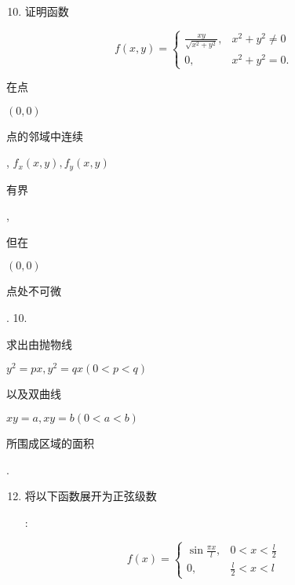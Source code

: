 \documentclass[10pt]{article}
\begin{document}
\begin{enumerate}
  \setcounter{enumi}{9}
  \item \begin{CJK}{UTF8}{mj}证明函数\end{CJK}
\end{enumerate}
$$
f(x, y)= \begin{cases}\frac{x y}{\sqrt{x^{2}+y^{2}}}, & x^{2}+y^{2} \neq 0 \\ 0, & x^{2}+y^{2}=0 .\end{cases}
$$
\begin{CJK}{UTF8}{mj}在点\end{CJK} $(0,0)$ \begin{CJK}{UTF8}{mj}点的邻域中连续\end{CJK}, $f_{x}(x, y), f_{y}(x, y)$ \begin{CJK}{UTF8}{mj}有界\end{CJK}, \begin{CJK}{UTF8}{mj}但在\end{CJK} $(0,0)$ \begin{CJK}{UTF8}{mj}点处不可微\end{CJK}. 10. \begin{CJK}{UTF8}{mj}求出由抛物线\end{CJK} $y^{2}=p x, y^{2}=q x(0<p<q)$ \begin{CJK}{UTF8}{mj}以及双曲线\end{CJK} $x y=a, x y=b(0<a<b)$ \begin{CJK}{UTF8}{mj}所围成区域的面积\end{CJK}.

\begin{enumerate}
  \setcounter{enumi}{11}
  \item \begin{CJK}{UTF8}{mj}将以下函数展开为正弦级数\end{CJK}:
\end{enumerate}
$$
f(x)= \begin{cases}\sin \frac{\pi x}{l}, & 0<x<\frac{l}{2} \\ 0, & \frac{l}{2}<x<l\end{cases}
$$
\end{document}
